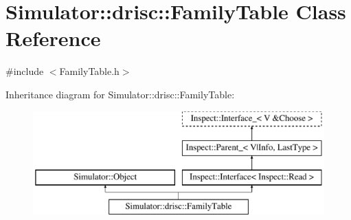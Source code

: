 \hypertarget{class_simulator_1_1drisc_1_1_family_table}{\section{Simulator\+:\+:drisc\+:\+:Family\+Table Class Reference}
\label{class_simulator_1_1drisc_1_1_family_table}
}


{\ttfamily \#include $<$Family\+Table.\+h$>$}

Inheritance diagram for Simulator\+:\+:drisc\+:\+:Family\+Table\+:\begin{figure}[H]
\begin{center}
\leavevmode
\includegraphics[height=4.000000cm]{class_simulator_1_1drisc_1_1_family_table}
\end{center}
\end{figure}

